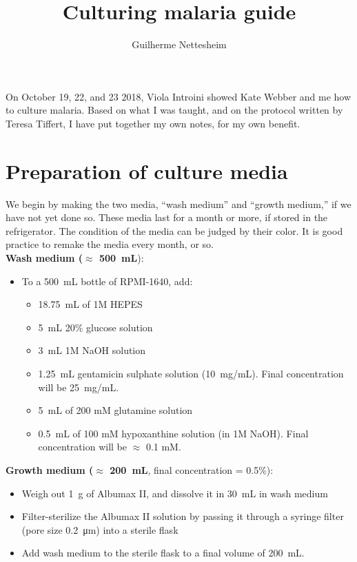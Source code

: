 \documentclass{article}
\author{Guilherme Nettesheim}
\title{Culturing malaria guide}
\begin{document}
\maketitle

On October 19, 22, and 23 2018, Viola Introini showed Kate Webber and me how to culture malaria. Based on what I was taught, and on the protocol written by Teresa Tiffert, I have put together my own notes, for my own benefit.\\

\section{Preparation of culture media}

We begin by making the two media, ``wash medium'' and ``growth medium,'' if we have not yet done so. These media last for a month or more, if stored in the refrigerator. The condition of the media can be judged by their color. It is good practice to remake the media every month, or so.\\

\textbf{Wash medium ($\approx$ \SI{500}{mL}}):

\begin{itemize}
	\item To a \SI{500}{mL} bottle of RPMI-1640, add:
	\begin{itemize}
		\item \SI{18.75}{\milli\liter} of 1M HEPES
		\item \SI{5}{\milli\liter} 20\% glucose solution
		\item \SI{3}{\milli\liter} 1M NaOH solution
		\item \SI{1.25}{\milli\liter} gentamicin sulphate solution (\SI{10}{mg/mL}). Final concentration will be \SI{25}{mg/mL}.
		\item \SI{5}{\milli\liter} of 200 mM glutamine solution
		\item \SI{0.5}{\milli\liter} of 100 mM hypoxanthine solution (in 1M NaOH). Final concentration will be $\approx$ 0.1 mM.
	\end{itemize}
\end{itemize}
	

\textbf{Growth medium ($\approx$ \SI{200}{mL}}, final concentration = 0.5\%):

\begin{itemize}
	\item Weigh out \SI{1}{g} of Albumax II, and dissolve it in \SI{30}{mL} in wash medium
	\item Filter-sterilize the Albumax II solution by passing it through a syringe filter (pore size \SI{0.2}{\micro\meter}) into a sterile flask
	\item Add wash medium to the sterile flask to a final volume of \SI{200}{mL}.
\end{itemize}
\end{document}
